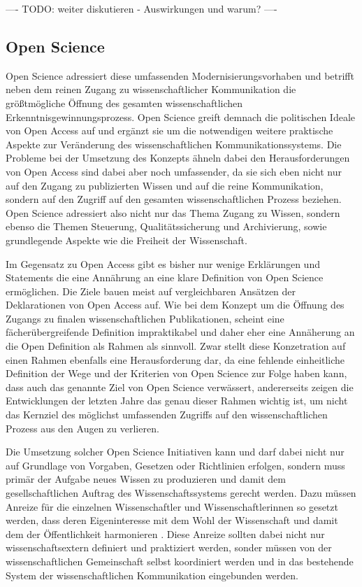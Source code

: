 ---- TODO: weiter diskutieren - Auswirkungen und warum? ----

\subsection{Open Science}

Open Science adressiert diese umfassenden Modernisierungsvorhaben und betrifft neben dem reinen Zugang zu wissenschaftlicher Kommunikation die größtmögliche Öffnung des gesamten wissenschaftlichen Erkenntnisgewinnungsprozess. Open Science greift demnach die politischen Ideale von Open Access auf und ergänzt sie um die notwendigen weitere praktische Aspekte zur Veränderung des wissenschaftlichen Kommunikationssystems. Die Probleme bei der Umsetzung des Konzepts ähneln dabei den Herausforderungen von Open Access sind dabei aber noch umfassender, da sie sich eben nicht nur auf den Zugang zu publizierten Wissen und auf die reine Kommunikation, sondern auf den Zugriff auf den gesamten wissenschaftlichen Prozess beziehen. Open Science adressiert also nicht nur das Thema Zugang zu Wissen, sondern ebenso die Themen Steuerung, Qualitätssicherung und Archivierung, sowie grundlegende Aspekte wie die Freiheit der Wissenschaft.

Im Gegensatz zu Open Access gibt es bisher nur wenige Erklärungen und Statements die eine Annährung an eine klare Definition von Open Science ermöglichen. Die Ziele bauen meist auf vergleichbaren Ansätzen der Deklarationen von Open Access auf. Wie bei dem Konzept um die Öffnung des Zugangs zu finalen wissenschaftlichen Publikationen, scheint eine fächerübergreifende Definition impraktikabel und daher eher eine Annäherung an die Open Definition als Rahmen als sinnvoll. Zwar stellt diese Konzetration auf einen Rahmen ebenfalls eine Herausforderung dar, da eine fehlende einheitliche Definition der Wege und der Kriterien von Open Science zur Folge haben kann, dass auch das genannte Ziel von Open Science verwässert, andererseits zeigen die Entwicklungen der letzten Jahre das genau dieser Rahmen wichtig ist, um nicht das Kernziel des möglichst umfassenden Zugriffs auf den wissenschaftlichen Prozess aus den Augen zu verlieren.

Die Umsetzung solcher Open Science Initiativen kann und darf dabei nicht nur auf Grundlage von Vorgaben, Gesetzen oder Richtlinien erfolgen, sondern muss primär der Aufgabe neues Wissen zu produzieren und damit dem gesellschaftlichen Auftrag des Wissenschaftssystems gerecht werden. Dazu müssen Anreize für die einzelnen Wissenschaftler und Wissenschaftlerinnen so gesetzt werden, dass deren Eigeninteresse mit dem Wohl der Wissenschaft und damit dem der Öffentlichkeit harmonieren \cite{brembs2015open}. Diese Anreize sollten dabei nicht nur wissenschaftsextern definiert und praktiziert werden, sonder müssen von der wissenschaftlichen Gemeinschaft selbst koordiniert werden und in das bestehende System der wissenschaftlichen Kommunikation eingebunden werden.

